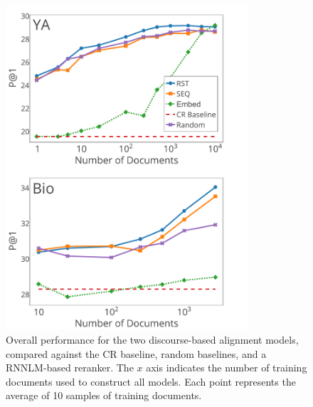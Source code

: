 \begin{figure}[t!]
\begin{center}
\includegraphics[width=90mm]{mainmatter/naacl2015-alignment/graphs_test2a.pdf}
\caption{{\small Overall performance for the two discourse-based alignment models,
compared against the CR baseline, random baselines, and a RNNLM-based reranker.
The $x$ axis indicates the number of training documents used to construct all models. 
Each point represents the average of 10 samples of training documents.  }}
\label{fig:performance}
\end{center}
\end{figure}

